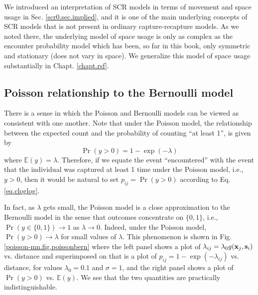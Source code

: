 We introduced an interpretation of SCR models in terms of movement
and space usage in Sec. \ref{scr0.sec.implied}, and it is one of the
main underlying concepts of SCR models that is not present in ordinary
capture-recapture models. As we noted there, the underlying model of
space usage is only as complex as the encounter probability model
which has been, so far in this book, only symmetric and stationary
(does not vary in space). We generalize this model of space usage
substantially in Chapt. \ref{chapt.rsf}.


\subsection{Poisson relationship to the Bernoulli model}
\label{poisson-mn.sec.approx}

There is a sense in which the Poisson and Bernoulli models can be
viewed as consistent with one another. Note that under the Poisson
model, the relationship between the expected count and the probability
of counting ``at least 1'', is given by 
\begin{equation}
 \Pr(y>0) = 1-\exp(-\lambda)
\label{eq.cloglog}
\end{equation}
where $\mathbb{E}(y) = \lambda$. 
Therefore, if we equate the event ``encountered'' with the event that
the individual was captured at least 1 time under the Poisson model,
i.e., $y>0$, then it would be natural to set $p_{ij} = \Pr(y>0)$
according to Eq. \ref{eq.cloglog}. %

In fact, as $\lambda$ gets small, the Poisson model is a close
approximation to the Bernoulli model in the sense that outcomes
concentrate on $\{0,1\}$, i.e., $\Pr(y\in \{0,1\}) \rightarrow 1$ as
$\lambda \rightarrow 0$.  Indeed, under the Poisson model, $\Pr(y>0)
\rightarrow \lambda$ for small values of $\lambda$.  This phenomenon
is shown in Fig.  \ref{poisson-mn.fig.poissonbern} where the left
panel shows a plot of $\lambda_{ij}=\lambda_{0}g({\bf x}_{j},{\bf
  s}_{i})$ vs. distance and superimposed on that is a plot of
$p_{ij}=1-\exp(-\lambda_{ij})$ vs. distance, for values $\lambda_{0} =
0.1$ and $\sigma = 1$, and the right panel shows a plot of $\Pr(y>0)$
vs. $\mathbb{E}(y)$. We see that the two quantities are practically
indistinguishable.

